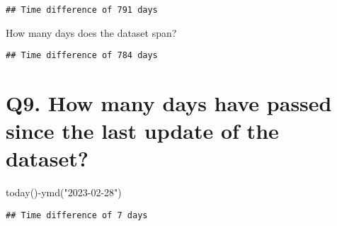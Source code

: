 \documentclass[
]{article}
\newenvironment{Shaded}{\begin{snugshade}}{\end{snugshade}}
\newcommand{\DecValTok}[1]{\textcolor[rgb]{0.00,0.00,0.81}{#1}}
\newcommand{\FunctionTok}[1]{\textcolor[rgb]{0.00,0.00,0.00}{#1}}
\newcommand{\NormalTok}[1]{#1}
\newcommand{\SpecialCharTok}[1]{\textcolor[rgb]{0.00,0.00,0.00}{#1}}
\newcommand{\StringTok}[1]{\textcolor[rgb]{0.31,0.60,0.02}{#1}}
\begin{document}
\begin{Shaded}
\end{Shaded}

\begin{verbatim}
## Time difference of 791 days
\end{verbatim}

How many days does the dataset span?

\begin{Shaded}
\end{Shaded}

\begin{verbatim}
## Time difference of 784 days
\end{verbatim}

\hypertarget{q9.-how-many-days-have-passed-since-the-last-update-of-the-dataset}{%
\section{Q9. How many days have passed since the last update of the
dataset?}\label{q9.-how-many-days-have-passed-since-the-last-update-of-the-dataset}}

\begin{Shaded}
\begin{Highlighting}[]
\FunctionTok{today}\NormalTok{()}\SpecialCharTok{{-}}\FunctionTok{ymd}\NormalTok{(}\StringTok{"2023{-}02{-}28"}\NormalTok{)}
\end{Highlighting}
\end{Shaded}

\begin{verbatim}
## Time difference of 7 days
\end{verbatim}

\begin{Shaded}
\end{Shaded}
\end{document}
